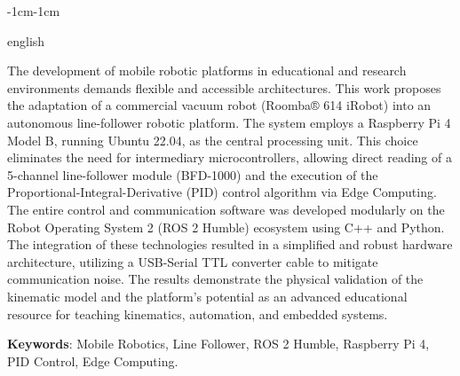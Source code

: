 \begin{adjustwidth}{-1cm}{-1cm}
\begin{resumo}[Abstract]			%
\begin{otherlanguage*}{english}		%

The development of mobile robotic platforms in educational and research environments demands flexible and accessible architectures. This work proposes the adaptation of a commercial vacuum robot (Roomba® 614 iRobot) into an autonomous line-follower robotic platform. The system employs a Raspberry Pi 4 Model B, running Ubuntu 22.04, as the central processing unit. This choice eliminates the need for intermediary microcontrollers, allowing direct reading of a 5-channel line-follower module (BFD-1000) and the execution of the Proportional-Integral-Derivative (PID) control algorithm via Edge Computing. The entire control and communication software was developed modularly on the Robot Operating System 2 (ROS 2 Humble) ecosystem using C++ and Python. The integration of these technologies resulted in a simplified and robust hardware architecture, utilizing a USB-Serial TTL converter cable to mitigate communication noise. The results demonstrate the physical validation of the kinematic model and the platform's potential as an advanced educational resource for teaching kinematics, automation, and embedded systems.

\vspace{\onelineskip}
\noindent
\textbf{Keywords}: Mobile Robotics, Line Follower, ROS 2 Humble, Raspberry Pi 4, PID Control, Edge Computing.
\end{otherlanguage*}
\end{resumo}
\end{adjustwidth}